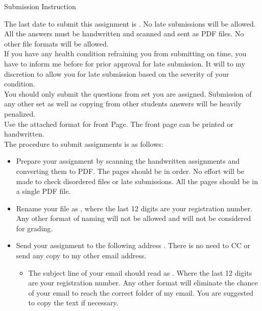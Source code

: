 \begin{center}
    \Huge{Submission Instruction}
\end{center}
\bigskip

\large{
The last date to submit this assignment is \submissionDeadline. No late submissions will be allowed. All the answers must be handwritten and scanned and sent as PDF files. No other file formats will be allowed.\\
If you have any health condition refraining you from submitting on time, you have to inform me before \noticeDeadline for prior approval for late submission. It will to my discretion to allow you for late submission based on the severity of your condition.\\
You should only submit the questions from set you are assigned. Submission of any other set as well as copying from other students answers will be heavily penalized.\\
Use the attached format for front Page. The front page can be printed or handwritten.\\
The procedure to submit assignments is as follows:
\begin{itemize}
    \item Prepare your assignment by scanning the handwritten assignments and converting them to PDF. The pages should be in order. No effort will be made to check disordered files or late submissions. All the pages should be in a single PDF file.
    \item Rename your file as \textbf{\fileName}, where the last 12 digits are your registration number. Any other format of naming will not be allowed and will not be considered for grading.
    \item Send your assignment to the following address \href{mailto:\emailAddress?subject=\emailSubject }{\emailAddress} . There is no need to CC or send any copy to my other email address.
    \begin{itemize}
        \item The subject line of your email should read as \textbf{\emailSubject} . Where the last 12 digits are your registration number. Any other format will eliminate the chance of your email to reach the correct folder of my email. You are suggested to copy the text if necessary.
    \end{itemize}
\end{itemize}

}
